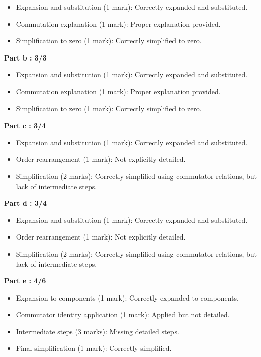 \documentclass[a4paper,11pt]{article}
\begin{document}
\begin{itemize}
    \item Expansion and substitution (1 mark): Correctly expanded and substituted.
    \item Commutation explanation (1 mark): Proper explanation provided.
    \item Simplification to zero (1 mark): Correctly simplified to zero.
\end{itemize}


\textbf{Part b : 3/3}

\begin{itemize}
    \item Expansion and substitution (1 mark): Correctly expanded and substituted.
    \item Commutation explanation (1 mark): Proper explanation provided.
    \item Simplification to zero (1 mark): Correctly simplified to zero.
\end{itemize}


\textbf{Part c : 3/4}

\begin{itemize}
    \item Expansion and substitution (1 mark): Correctly expanded and substituted.
    \item Order rearrangement (1 mark): Not explicitly detailed.
    \item Simplification (2 marks): Correctly simplified using commutator relations, but lack of intermediate steps.
\end{itemize}


\textbf{Part d : 3/4}

\begin{itemize}
    \item Expansion and substitution (1 mark): Correctly expanded and substituted.
    \item Order rearrangement (1 mark): Not explicitly detailed.
    \item Simplification (2 marks): Correctly simplified using commutator relations, but lack of intermediate steps.
\end{itemize}



\textbf{Part e : 4/6}

\begin{itemize}
    \item Expansion to components (1 mark): Correctly expanded to components.
    \item Commutator identity application (1 mark): Applied but not detailed.
    \item Intermediate steps (3 marks): Missing detailed steps.
    \item Final simplification (1 mark): Correctly simplified.
\end{itemize}
\end{document}
